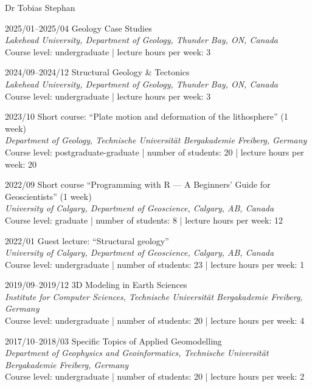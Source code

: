 \documentclass[10pt, paper=letter]{scrartcl} %
\begin{document}
\begin{cv}{\textsf{Dr Tobias Stephan}}
    \begin{cvlist}{}
        \item[2025/01--2025/04] Geology Case Studies\\
        \textit{Lakehead University, Department of Geology, Thunder Bay, ON, Canada}\\
        Course level: undergraduate | lecture hours per week: 3
        \item[2024/09--2024/12] Structural Geology \& Tectonics\\
        \textit{Lakehead University, Department of Geology, Thunder Bay, ON, Canada}\\
        Course level: undergraduate |  lecture hours per week: 3
        \item[2023/10] Short course: \enquote{Plate motion and deformation of the lithosphere} (1 week)\\
        \textit{Department of Geology, Technische Universit\"at Bergakademie Freiberg, Germany}
        Course level: postgraduate-graduate | number of students: 20 | lecture hours per week: 20
        \item[2022/09] Short course \enquote{Programming with R --- A Beginners’ Guide for Geoscientists} (1 week)\\
        \textit{University of Calgary, Department of Geoscience, Calgary, AB, Canada}\\
        Course level: graduate | number of students: 8 | lecture hours per week: 12
        \item[2022/01] Guest lecture: \enquote{Structural geology}\\
        \textit{University of Calgary, Department of Geoscience, Calgary, AB, Canada}\\
        Course level: undergraduate | number of students: 23 | lecture hours per week: 1
        \item[2019/09--2019/12] 3D Modeling in Earth Sciences\\
        \textit{Institute for Computer Sciences, Technische Universit\"at Bergakademie Freiberg, Germany}\\
        Course level: undergraduate | number of students: 20 | lecture hours per week: 4
        \item[2017/10--2018/03] Specific Topics of Applied Geomodelling\\
        \textit{Department of Geophysics and Geoinformatics, Technische Universit\"at Bergakademie Freiberg, Germany}\\
        Course level: undergraduate | number of students: 20 | lecture hours per week: 2

\end{cvlist}
\end{cv}
\end{document}
